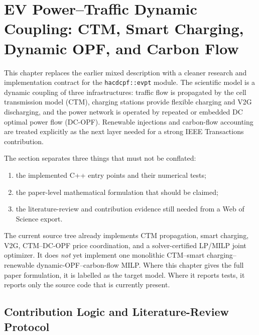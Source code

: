\section{EV Power--Traffic Dynamic Coupling: CTM, Smart Charging, Dynamic OPF, and Carbon Flow}
\label{sec:ev_power_traffic_dynamic_model}

This chapter replaces the earlier mixed description with a cleaner research
and implementation contract for the \texttt{hacdcpf::evpt} module. The
scientific model is a dynamic coupling of three infrastructures: traffic flow
is propagated by the cell transmission model (CTM), charging stations provide
flexible charging and V2G discharging, and the power network is operated by
repeated or embedded DC optimal power flow (DC-OPF). Renewable injections and
carbon-flow accounting are treated explicitly as the next layer needed for a
strong IEEE Transactions contribution.

The section separates three things that must not be conflated:
\begin{enumerate}
  \item the implemented C++ entry points and their numerical tests;
  \item the paper-level mathematical formulation that should be claimed;
  \item the literature-review and contribution evidence still needed from a
        Web of Science export.
\end{enumerate}

\begin{remark}
  The current source tree already implements CTM propagation, smart charging,
  V2G, CTM--DC-OPF price coordination, and a solver-certified LP/MILP joint
  optimizer. It does \emph{not} yet implement one monolithic CTM--smart
  charging--renewable dynamic-OPF--carbon-flow MILP. Where this chapter gives
  the full paper formulation, it is labelled as the target model. Where it
  reports tests, it reports only the source code that is currently present.
\end{remark}

\subsection{Contribution Logic and Literature-Review Protocol}
\label{sec:evpt-literature-protocol}

